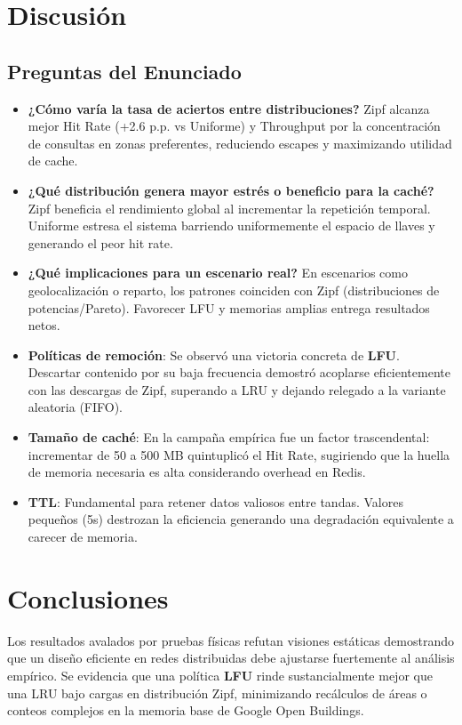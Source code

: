 \documentclass[letter,12pt]{article}
\begin{document}
\section{Discusión}
\subsection{Preguntas del Enunciado}
\begin{itemize}
  \item \textbf{¿Cómo varía la tasa de aciertos entre distribuciones?} Zipf alcanza mejor Hit Rate (+2.6 p.p. vs Uniforme) y Throughput por la concentración de consultas en zonas preferentes, reduciendo escapes y maximizando utilidad de cache.
  \item \textbf{¿Qué distribución genera mayor estrés o beneficio para la caché?} Zipf beneficia el rendimiento global al incrementar la repetición temporal. Uniforme estresa el sistema barriendo uniformemente el espacio de llaves y generando el peor hit rate.
  \item \textbf{¿Qué implicaciones para un escenario real?} En escenarios como geolocalización o reparto, los patrones coinciden con Zipf (distribuciones de potencias/Pareto). Favorecer LFU y memorias amplias entrega resultados netos.
  \item \textbf{Políticas de remoción}: Se observó una victoria concreta de \textbf{LFU}. Descartar contenido por su baja frecuencia demostró acoplarse eficientemente con las descargas de Zipf, superando a LRU y dejando relegado a la variante aleatoria (FIFO).
  \item \textbf{Tamaño de caché}: En la campaña empírica fue un factor trascendental: incrementar de 50 a 500 MB quintuplicó el Hit Rate, sugiriendo que la huella de memoria necesaria es alta considerando overhead en Redis.
  \item \textbf{TTL}: Fundamental para retener datos valiosos entre tandas. Valores pequeños (5s) destrozan la eficiencia generando una degradación equivalente a carecer de memoria.
\end{itemize}

\section{Conclusiones}
Los resultados avalados por pruebas físicas refutan visiones estáticas demostrando que un diseño eficiente en redes distribuidas debe ajustarse fuertemente al análisis empírico. Se evidencia que una política \textbf{LFU} rinde sustancialmente mejor que una LRU bajo cargas en distribución Zipf, minimizando recálculos de áreas o conteos complejos en la memoria base de Google Open Buildings. 
\end{document}
